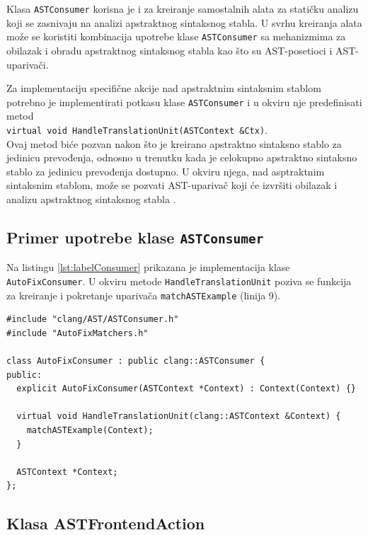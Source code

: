 \documentclass[12pt,oneside]{memoir}
\begin{document}
Klasa \texttt{ASTConsumer} korisna je i za kreiranje samostalnih alata za stati\v{c}ku analizu koji se zasnivaju na analizi apstraktnog sintaksnog stabla. U svrhu kreiranja alata mo\v{z}e se koristiti kombinacija upotrebe klase \texttt{ASTConsumer} sa mehanizmima za obilazak i obradu apstraktnog sintaksnog stabla kao \v{s}to su AST-posetioci i AST-upariva\v{c}i. \par
Za implementaciju specifi\v{c}ne akcije nad apstraktnim sintaksnim stablom
potrebno je implementirati potkasu klase \texttt{ASTConsumer} i u okviru nje predefinisati metod \\ \texttt{virtual void  HandleTranslationUnit(ASTContext \&Ctx)}.\\
Ovaj metod bi\'{c}e pozvan nakon \v{s}to je kreirano apstraktno sintaksno stablo za jedinicu prevođenja, odnosno u trenutku kada je celokupno apstraktno sintaksno stablo za jedinicu prevođenja dostupno.
U okviru njega, nad asptraktnim sintaksnim stablom, mo\v{z}e se pozvati AST-upariva\v{c} koji \'{c}e izvr\v{s}iti obilazak i analizu apstraktnog sintaksnog stabla \cite{ASTConsumer}.

\subsection{Primer upotrebe klase \texttt{ASTConsumer}}
Na listingu \ref{lst:labelConsumer} prikazana je implementacija klase \texttt{AutoFixConsumer}. U okviru metode \texttt{HandleTranslationUnit}
poziva se funkcija za kreiranje i pokretanje upariva\v{c}a \texttt{matchASTExample} (linija 9). 

\begin{lstlisting}[style=customc,  caption={Implementacija klase \texttt{AutoFixConsumer}. Funkcija \texttt{matchASTExample} prikazana je na listingu \ref{lst:MatcherList} i dostupna je kroz zaglavlje \texttt{AutoFixMatchers.h}.}, label=lst:labelConsumer]
#include "clang/AST/ASTConsumer.h"
#include "AutoFixMatchers.h"

class AutoFixConsumer : public clang::ASTConsumer {
public:
  explicit AutoFixConsumer(ASTContext *Context) : Context(Context) {}

  virtual void HandleTranslationUnit(clang::ASTContext &Context) {
    matchASTExample(Context);
  }

  ASTContext *Context;
};
\end{lstlisting}

\subsection{Klasa ASTFrontendAction}
\end{document}
